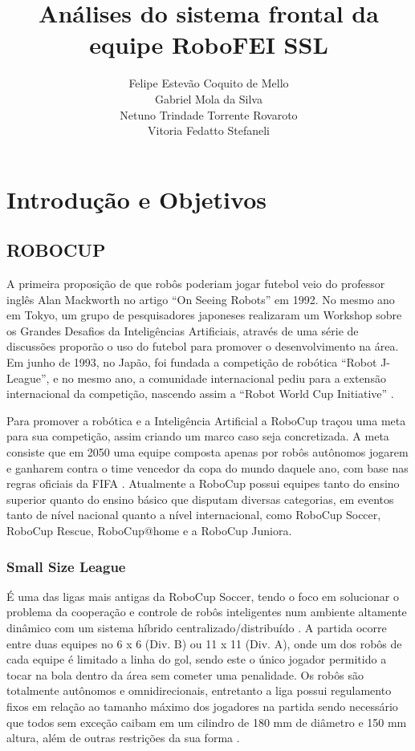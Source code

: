\documentclass[deposito, acronym, symbols]{fei}
\title{Análises do sistema frontal da equipe RoboFEI SSL}
\author{ Felipe Estevão Coquito de Mello \\ Gabriel Mola da Silva \\ Netuno Trindade Torrente Rovaroto \\ Vitoria Fedatto Stefaneli}
\begin{document}
\maketitle

\listoffigures

\chapter{Introdução e Objetivos}

\section{ROBOCUP}

A primeira proposição de que robôs poderiam jogar futebol veio do professor inglês Alan Mackworth no artigo “On Seeing Robots” em 1992. No mesmo ano em Tokyo, um grupo de pesquisadores japoneses realizaram um Workshop sobre os Grandes Desafios da Inteligências Artificiais, através de uma série de discussões proporão o uso do futebol para promover o desenvolvimento na área. Em junho de 1993, no Japão, foi fundada a competição de robótica “Robot J-League”, e no mesmo ano, a comunidade internacional pediu para a extensão internacional da competição, nascendo assim a “Robot World Cup Initiative” \cite{history}.

Para promover a robótica e a Inteligência Artificial a RoboCup traçou uma meta para sua competição, assim criando um marco caso seja concretizada. A meta consiste que em 2050 uma equipe composta apenas por robôs autônomos jogarem e ganharem contra o time vencedor da copa do mundo daquele ano, com base nas regras oficiais da FIFA \cite{objective}. Atualmente a RoboCup possui equipes tanto do ensino superior quanto do ensino básico que disputam diversas categorias, em eventos tanto de nível nacional quanto a nível internacional, como RoboCup Soccer, RoboCup Rescue, RoboCup@home e a RoboCup Juniora.

\subsection{Small Size League}

É uma das ligas mais antigas da RoboCup Soccer, tendo o foco em solucionar o problema da cooperação e controle de robôs inteligentes num ambiente altamente dinâmico com um sistema híbrido centralizado/distribuído \cite{about}. A partida ocorre entre duas equipes no 6 x 6 (Div. B) ou 11 x 11 (Div. A), onde um dos robôs de cada equipe é limitado a linha do gol, sendo este o único jogador permitido a tocar na bola dentro da área sem cometer uma penalidade. Os robôs são totalmente autônomos e omnidirecionais, entretanto a liga possui regulamento fixos em relação ao tamanho máximo dos jogadores na partida sendo necessário que todos sem exceção caibam em um cilindro de 180 mm de diâmetro e 150 mm altura, além de outras restrições da sua forma \cite{rules}.
\end{document}
